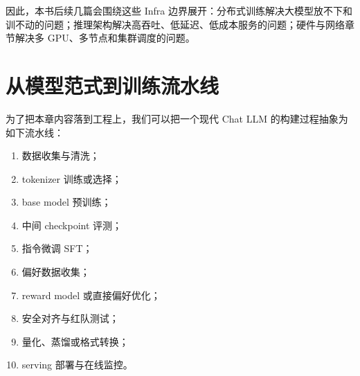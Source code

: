 因此，本书后续几篇会围绕这些 Infra 边界展开：分布式训练解决大模型放不下和训不动的问题；推理架构解决高吞吐、低延迟、低成本服务的问题；硬件与网络章节解决多 GPU、多节点和集群调度的问题。

\section{从模型范式到训练流水线}
\label{sec:from-model-paradigm-to-training-pipeline}

为了把本章内容落到工程上，我们可以把一个现代 Chat LLM 的构建过程抽象为如下流水线：

\begin{enumerate}
\item 数据收集与清洗；
\item tokenizer 训练或选择；
\item base model 预训练；
\item 中间 checkpoint 评测；
\item 指令微调 SFT；
\item 偏好数据收集；
\item reward model 或直接偏好优化；
\item 安全对齐与红队测试；
\item 量化、蒸馏或格式转换；
\item serving 部署与在线监控。
\end{enumerate}

